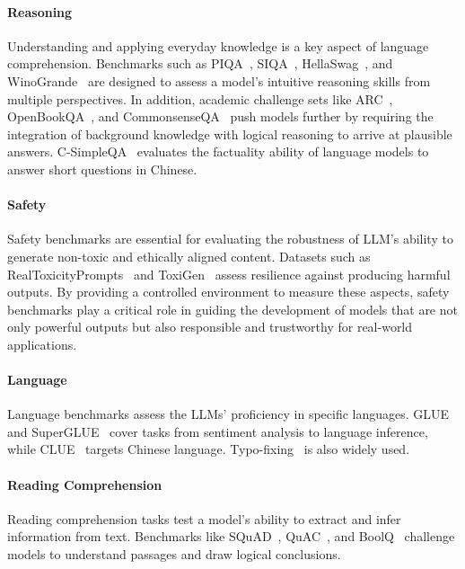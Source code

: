 \paragraph{Reasoning}
Understanding and applying everyday knowledge is a key aspect of language comprehension. Benchmarks such as PIQA~\citep{bisk2020piqa}, SIQA~\citep{sap2019socialiqa}, HellaSwag~\citep{zellers2019hellaswag}, and WinoGrande~\citep{sakaguchi2021winogrande} are designed to assess a model’s intuitive reasoning skills from multiple perspectives. In addition, academic challenge sets like ARC~\citep{clark2018think}, OpenBookQA~\citep{mihaylov2018can}, and CommonsenseQA~\citep{talmor2018commonsenseqa} push models further by requiring the integration of background knowledge with logical reasoning to arrive at plausible answers. C-SimpleQA~\citep{he2024chinese} evaluates the factuality ability of language models to answer short questions in Chinese.




\paragraph{Safety}
Safety benchmarks are essential for evaluating the robustness of LLM’s ability to generate non-toxic and ethically aligned content. Datasets such as RealToxicityPrompts~\citep{gehman-etal-2020-realtoxicityprompts} and ToxiGen~\citep{hartvigsen2022toxigen} assess resilience against producing harmful outputs.
By providing a controlled environment to measure these aspects, safety benchmarks play a critical role in guiding the development of models that are not only powerful outputs but also responsible and trustworthy for real-world applications.



\paragraph{Language}
Language benchmarks assess the LLMs’ proficiency in specific languages.
GLUE~\citep{wang2018glue} and SuperGLUE~\citep{wang2019superglue} cover tasks from sentiment analysis to  language inference, while CLUE~\citep{xu2020clue} targets Chinese language.
Typo-fixing~\citep{suzgun2022challenging} is also widely used.

\paragraph{Reading Comprehension}
Reading comprehension tasks test a model’s ability to extract and infer information from text. Benchmarks like SQuAD~\citep{rajpurkar2018know}, QuAC~\citep{choi2018quac}, and BoolQ~\citep{clark2019boolq} challenge models to understand passages and draw logical conclusions.






